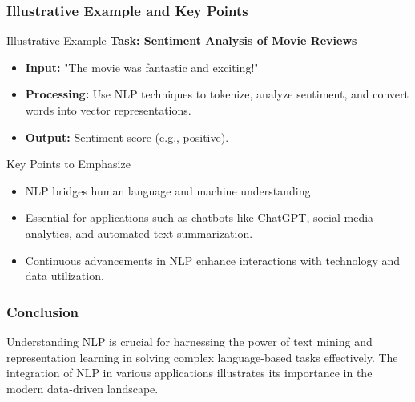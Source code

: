\documentclass[aspectratio=169]{beamer}
\begin{document}
\begin{frame}[fragile]
    \frametitle{Illustrative Example and Key Points}
    \begin{block}{Illustrative Example}
        \textbf{Task: Sentiment Analysis of Movie Reviews}  
        \begin{itemize}
            \item \textbf{Input:} "The movie was fantastic and exciting!"
            \item \textbf{Processing:} Use NLP techniques to tokenize, analyze sentiment, and convert words into vector representations.
            \item \textbf{Output:} Sentiment score (e.g., positive).
        \end{itemize}
    \end{block}

    \begin{block}{Key Points to Emphasize}
        \begin{itemize}
            \item NLP bridges human language and machine understanding.
            \item Essential for applications such as chatbots like ChatGPT, social media analytics, and automated text summarization.
            \item Continuous advancements in NLP enhance interactions with technology and data utilization.
        \end{itemize}
    \end{block}
\end{frame}

\begin{frame}[fragile]
    \frametitle{Conclusion}
    Understanding NLP is crucial for harnessing the power of text mining and representation learning in solving complex language-based tasks effectively. The integration of NLP in various applications illustrates its importance in the modern data-driven landscape.
\end{frame}
\end{document}
